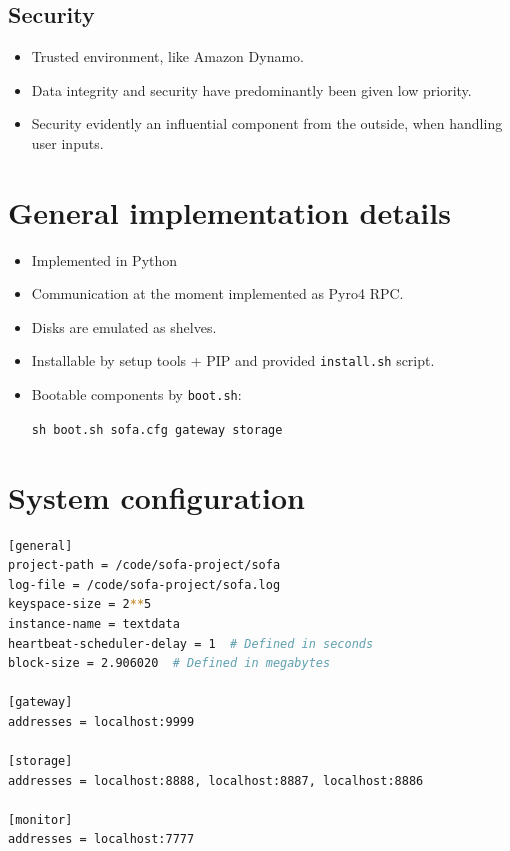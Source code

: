 \documentclass[paper=128mm:96mm, fontsize=11pt, pagesize, parskip=half-,]{scrartcl}
\theoremstyle{definition}
\newcommand*{\newslide}{\clearpage}
\begin{document}
\subsection{Security}
\begin{itemize}
	\item Trusted environment, like Amazon Dynamo.
	\item Data integrity and security have predominantly been given low priority.
	\item Security evidently an influential component from the outside, when handling user inputs.
\end{itemize}
\newslide

\section{General implementation details}
\begin{itemize}
	\item Implemented in Python
	\item Communication at the moment implemented as Pyro4 RPC.
	\item Disks are emulated as shelves.
	\item Installable by setup tools + PIP and provided \texttt{install.sh} script.
	\item Bootable components by \texttt{boot.sh}:
	
	\quad \texttt{sh boot.sh sofa.cfg gateway storage}
\end{itemize}
\newslide

\section{System configuration}
\vspace*{3mm}
\begin{lstlisting}[language=bash, frame=single, basicstyle=\ttfamily\tiny, otherkeywords={[,],=}]
[general]
project-path = /code/sofa-project/sofa
log-file = /code/sofa-project/sofa.log
keyspace-size = 2**5
instance-name = textdata
heartbeat-scheduler-delay = 1  # Defined in seconds
block-size = 2.906020  # Defined in megabytes

[gateway]
addresses = localhost:9999

[storage]
addresses = localhost:8888, localhost:8887, localhost:8886

[monitor]
addresses = localhost:7777
\end{lstlisting}
\newslide
\end{document}
